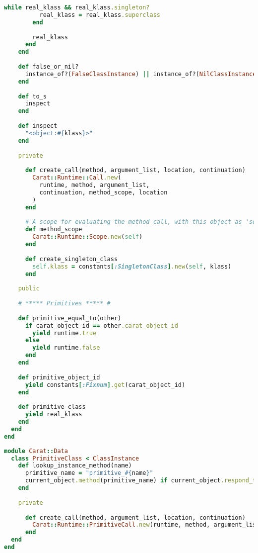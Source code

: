 \begin{lstlisting}[title={\small\Helvetica data/object.rb},language=Ruby]
        while real_klass && real_klass.singleton?
          real_klass = real_klass.superclass
        end
        
        real_klass
      end
    end
    
    def false_or_nil?
      instance_of?(FalseClassInstance) || instance_of?(NilClassInstance)
    end
    
    def to_s
      inspect
    end
    
    def inspect
      "<object:#{klass}>"
    end
    
    private
    
      def create_call(method, argument_list, location, continuation)
        Carat::Runtime::Call.new(
          runtime, method, argument_list,
          continuation, method_scope, location
        )
      end
      
      # A scope for evaluating the method call, with this object as 'self'
      def method_scope
        Carat::Runtime::Scope.new(self)
      end
      
      def create_singleton_class
        self.klass = constants[:SingletonClass].new(self, klass)
      end
    
    public
    
    # ***** Primitives ***** #
    
    def primitive_equal_to(other)
      if carat_object_id == other.carat_object_id
        yield runtime.true
      else
        yield runtime.false
      end
    end
    
    def primitive_object_id
      yield constants[:Fixnum].get(carat_object_id)
    end
    
    def primitive_class
      yield real_klass
    end
  end
end

\end{lstlisting}
\begin{lstlisting}[title={\small\Helvetica data/primitive.rb},language=Ruby]
module Carat::Data
  class PrimitiveClass < ClassInstance
    def lookup_instance_method(name)
      primitive_name = "primitive_#{name}"
      current_object.method(primitive_name) if current_object.respond_to?(primitive_name)
    end
    
    private
    
      def create_call(method, argument_list, location, continuation)
        Carat::Runtime::PrimitiveCall.new(runtime, method, argument_list, continuation)
      end
  end
end

\end{lstlisting}
